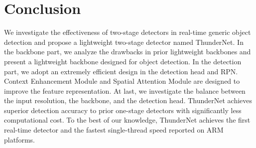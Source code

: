 \documentclass[10pt,twocolumn,letterpaper]{article}
\begin{document}
\section{Conclusion}

We investigate the effectiveness of two-stage detectors in real-time generic object detection and propose a lightweight two-stage detector named ThunderNet.
In the backbone part, we analyze the drawbacks in prior lightweight backbones and present a lightweight backbone designed for object detection.
In the detection part, we adopt an extremely efficient design in the detection head and RPN.
Context Enhancement Module and Spatial Attention Module are designed to improve the feature representation.
At last, we investigate the balance between the input resolution, the backbone, and the detection head.
ThunderNet achieves superior detection accuracy to prior one-stage detectors with significantly less computational cost.
To the best of our knowledge, ThunderNet achieves the first real-time detector and the fastest single-thread speed reported on ARM platforms.










{\small


}
\end{document}
